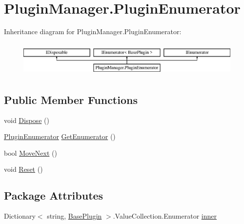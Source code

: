 \hypertarget{structOTA_1_1PluginManager_1_1PluginEnumerator}{}\section{Plugin\+Manager.\+Plugin\+Enumerator}
\label{structOTA_1_1PluginManager_1_1PluginEnumerator}
Inheritance diagram for Plugin\+Manager.\+Plugin\+Enumerator\+:\begin{figure}[H]
\begin{center}
\leavevmode
\includegraphics[height=1.777778cm]{structOTA_1_1PluginManager_1_1PluginEnumerator}
\end{center}
\end{figure}
\subsection*{Public Member Functions}
\begin{DoxyCompactItemize}
\item 
void \hyperlink{structOTA_1_1PluginManager_1_1PluginEnumerator_a6e2d745cdb7a7b983f861ed6a9a541a7}{Dispose} ()
\item 
\hyperlink{structOTA_1_1PluginManager_1_1PluginEnumerator}{Plugin\+Enumerator} \hyperlink{structOTA_1_1PluginManager_1_1PluginEnumerator_a8af774867b486784a201aaf4a08c870c}{Get\+Enumerator} ()
\item 
bool \hyperlink{structOTA_1_1PluginManager_1_1PluginEnumerator_ad5316c283894d57be1450edab878aed0}{Move\+Next} ()
\item 
void \hyperlink{structOTA_1_1PluginManager_1_1PluginEnumerator_a372de693ad40b3f42839c8ec6ac845f4}{Reset} ()
\end{DoxyCompactItemize}
\subsection*{Package Attributes}
\begin{DoxyCompactItemize}
\item 
Dictionary$<$ string, \hyperlink{classOTA_1_1Plugin_1_1BasePlugin}{Base\+Plugin} $>$.Value\+Collection.\+Enumerator \hyperlink{structOTA_1_1PluginManager_1_1PluginEnumerator_a9c1e37b55b8cbad1421434f1c206daea}{inner}
\end{DoxyCompactItemize}

